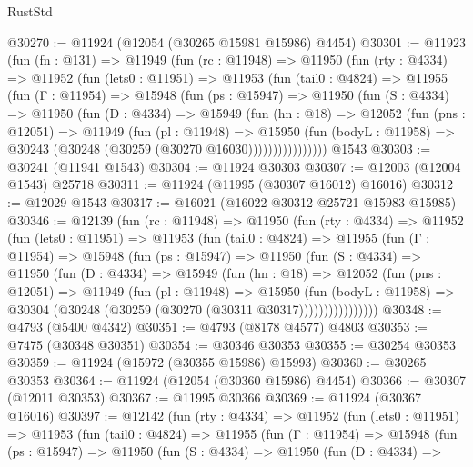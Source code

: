 \begin{lexlean}{RustStd}
\begin{coremodule}
{\begin{coremodule}
{{{{{{{{{{{{{{{{{{{{{{{{{{{{{{{{{{{{{{{{{{{{{{{{{{{{{{{{{{{{{{{{{{{{{{{{{{{{{{{{@30270 := @11924 (@12054 (@30265 @15981 @15986) @4454)
@30301 := @11923
    (fun (fn : @131) =>
    @11949
      (fun (rc : @11948) =>
      @11950
        (fun (rty : @4334) =>
        @11952
          (fun (lets0 : @11951) =>
          @11953
            (fun (tail0 : @4824) =>
            @11955
              (fun (Γ : @11954) =>
              @15948
                (fun (ps : @15947) =>
                @11950
                  (fun (S : @4334) =>
                  @11950
                    (fun (D : @4334) =>
                    @15949
                      (fun (hn : @18) =>
                      @12052
                        (fun (pns : @12051) =>
                        @11949
                          (fun (pl : @11948) =>
                          @15950
                            (fun (bodyL : @11958) =>
                            @30243 (@30248 (@30259 (@30270 @16030))))))))))))))))
    @1543
@30303 := @30241 (@11941 @1543)
@30304 := @11924 @30303
@30307 := @12003 (@12004 @1543) @25718
@30311 := @11924 (@11995 (@30307 @16012) @16016)
@30312 := @12029 @1543
@30317 := @16021 (@16022 @30312 @25721 @15983 @15985)
@30346 := @12139
    (fun (rc : @11948) =>
    @11950
      (fun (rty : @4334) =>
      @11952
        (fun (lets0 : @11951) =>
        @11953
          (fun (tail0 : @4824) =>
          @11955
            (fun (Γ : @11954) =>
            @15948
              (fun (ps : @15947) =>
              @11950
                (fun (S : @4334) =>
                @11950
                  (fun (D : @4334) =>
                  @15949
                    (fun (hn : @18) =>
                    @12052
                      (fun (pns : @12051) =>
                      @11949
                        (fun (pl : @11948) =>
                        @15950
                          (fun (bodyL : @11958) =>
                          @30304 (@30248 (@30259 (@30270 (@30311 @30317))))))))))))))))
@30348 := @4793 (@5400 @4342)
@30351 := @4793 (@8178 @4577) @4803
@30353 := @7475 (@30348 @30351)
@30354 := @30346 @30353
@30355 := @30254 @30353
@30359 := @11924 (@15972 (@30355 @15986) @15993)
@30360 := @30265 @30353
@30364 := @11924 (@12054 (@30360 @15986) @4454)
@30366 := @30307 (@12011 @30353)
@30367 := @11995 @30366
@30369 := @11924 (@30367 @16016)
@30397 := @12142
    (fun (rty : @4334) =>
    @11952
      (fun (lets0 : @11951) =>
      @11953
        (fun (tail0 : @4824) =>
        @11955
          (fun (Γ : @11954) =>
          @15948
            (fun (ps : @15947) =>
            @11950
              (fun (S : @4334) =>
              @11950
                (fun (D : @4334) =>
}}}}}}}}}}}}}}}}}}}}}}}}}}}}}}}}}}}}}}}}}}}}}}}}}}}}}}}}}}}}}}}}}}}}}}}}}}}}}}}}
\end{coremodule}}
\end{coremodule}
\end{lexlean}
